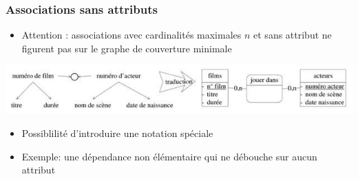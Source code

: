 \begin{frame}
  \frametitle{Associations sans attributs}
  \begin{itemize}
    \item Attention : associations avec cardinalités maximales $n$ et sans attribut ne figurent pas sur le
      graphe de couverture minimale
  \end{itemize}
  \begin{center}
    \includegraphics[width=\linewidth]{association_sans_attribut.jpg}
  \end{center}
  \begin{itemize}
    \item Possiblilité d'introduire une notation spéciale
    \item Exemple: une dépendance non élémentaire qui ne débouche sur aucun attribut
  \end{itemize}
\end{frame}
